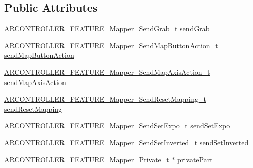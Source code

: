 \subsection*{Public Attributes}
\begin{DoxyCompactItemize}
\item 
\hyperlink{_a_r_c_o_n_t_r_o_l_l_e_r___feature_8h_a2d0c90df4b1c92b6fa98abfd3509c2bf}{A\+R\+C\+O\+N\+T\+R\+O\+L\+L\+E\+R\+\_\+\+F\+E\+A\+T\+U\+R\+E\+\_\+\+Mapper\+\_\+\+Send\+Grab\+\_\+t} \hyperlink{struct_a_r_c_o_n_t_r_o_l_l_e_r___f_e_a_t_u_r_e___mapper__t_a06fabbcd749fb0ba632e07ac99663a86}{send\+Grab}
\item 
\hyperlink{_a_r_c_o_n_t_r_o_l_l_e_r___feature_8h_adc7fdf78bbd048b6699c548f6fb6bbc8}{A\+R\+C\+O\+N\+T\+R\+O\+L\+L\+E\+R\+\_\+\+F\+E\+A\+T\+U\+R\+E\+\_\+\+Mapper\+\_\+\+Send\+Map\+Button\+Action\+\_\+t} \hyperlink{struct_a_r_c_o_n_t_r_o_l_l_e_r___f_e_a_t_u_r_e___mapper__t_a7473e15726fb5b391f7e3ef9f5a8118c}{send\+Map\+Button\+Action}
\item 
\hyperlink{_a_r_c_o_n_t_r_o_l_l_e_r___feature_8h_a0a7f381c28e301ca25480edfc6c080fd}{A\+R\+C\+O\+N\+T\+R\+O\+L\+L\+E\+R\+\_\+\+F\+E\+A\+T\+U\+R\+E\+\_\+\+Mapper\+\_\+\+Send\+Map\+Axis\+Action\+\_\+t} \hyperlink{struct_a_r_c_o_n_t_r_o_l_l_e_r___f_e_a_t_u_r_e___mapper__t_aefe95d6c4dd052600845df4cae5ff131}{send\+Map\+Axis\+Action}
\item 
\hyperlink{_a_r_c_o_n_t_r_o_l_l_e_r___feature_8h_aa9c36e34995d0b7d9aba69d57764b62e}{A\+R\+C\+O\+N\+T\+R\+O\+L\+L\+E\+R\+\_\+\+F\+E\+A\+T\+U\+R\+E\+\_\+\+Mapper\+\_\+\+Send\+Reset\+Mapping\+\_\+t} \hyperlink{struct_a_r_c_o_n_t_r_o_l_l_e_r___f_e_a_t_u_r_e___mapper__t_a2d4e26a5128573c4f457f72b60844aa1}{send\+Reset\+Mapping}
\item 
\hyperlink{_a_r_c_o_n_t_r_o_l_l_e_r___feature_8h_abe37196b35579beeda7036c1185212e2}{A\+R\+C\+O\+N\+T\+R\+O\+L\+L\+E\+R\+\_\+\+F\+E\+A\+T\+U\+R\+E\+\_\+\+Mapper\+\_\+\+Send\+Set\+Expo\+\_\+t} \hyperlink{struct_a_r_c_o_n_t_r_o_l_l_e_r___f_e_a_t_u_r_e___mapper__t_a119b435ad27b6fd51649de13eac3e6e1}{send\+Set\+Expo}
\item 
\hyperlink{_a_r_c_o_n_t_r_o_l_l_e_r___feature_8h_a0537a2be4cffe0935fc455e1ab7dcbd0}{A\+R\+C\+O\+N\+T\+R\+O\+L\+L\+E\+R\+\_\+\+F\+E\+A\+T\+U\+R\+E\+\_\+\+Mapper\+\_\+\+Send\+Set\+Inverted\+\_\+t} \hyperlink{struct_a_r_c_o_n_t_r_o_l_l_e_r___f_e_a_t_u_r_e___mapper__t_aeb7b5a6d5334c8434c23e0ce23b8dd61}{send\+Set\+Inverted}
\item 
\hyperlink{_a_r_c_o_n_t_r_o_l_l_e_r___feature_8h_a641e5a869696491e4891f3baf27969f4}{A\+R\+C\+O\+N\+T\+R\+O\+L\+L\+E\+R\+\_\+\+F\+E\+A\+T\+U\+R\+E\+\_\+\+Mapper\+\_\+\+Private\+\_\+t} $\ast$ \hyperlink{struct_a_r_c_o_n_t_r_o_l_l_e_r___f_e_a_t_u_r_e___mapper__t_a6a7c2cfdd89cc856d07d0b525b204f5c}{private\+Part}
\end{DoxyCompactItemize}


